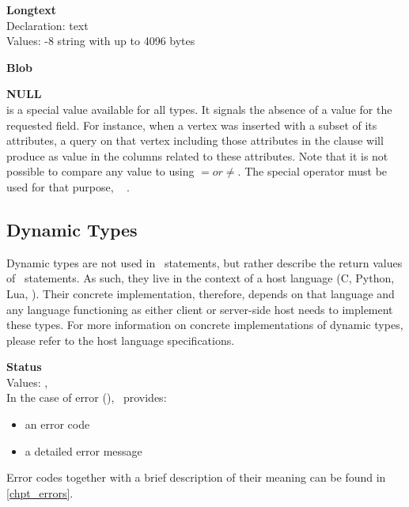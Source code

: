 \begin{minipage}{\textwidth}
\textbf{Longtext} \\
Declaration: text \\
Values: -8 string with up to 4096 bytes\\
\end{minipage}

\begin{minipage}{\textwidth}
\textbf{Blob} \\
\end{minipage}

\begin{minipage}{\textwidth}
\textbf{NULL} \\
 is a special value available for all types.
It signals the absence of a value for the requested field.
For instance, when a vertex was inserted with a subset
of its attributes, a query on that vertex including
those attributes in the  clause
will produce  as value in the
columns related to these attributes.
Note that it is not possible to compare any value to 
using $= or \neq$. The special operator  must
be used for that purpose, \eg\
  .
\end{minipage}

\subsection{Dynamic Types}
Dynamic types are not used in \sql\ statements,
but rather describe the return values of \sql\
statements. As such, they live in the context
of a host language (C, Python, Lua, \etc).
Their concrete implementation, therefore,
depends on that language and any language
functioning as either client or server-side host
needs to implement these types.
For more information on concrete implementations
of dynamic types, please refer to the
host language \acronym{api} specifications.

\begin{minipage}{\textwidth}
\textbf{Status}\\
Values: , \\
In the case of error (), \nowdb\ provides:
\begin{itemize}
\item an error code
\item a detailed error message
\end{itemize}
Error codes together with a brief description
of their meaning can be found in \ref{chpt_errors}.
\end{minipage}

